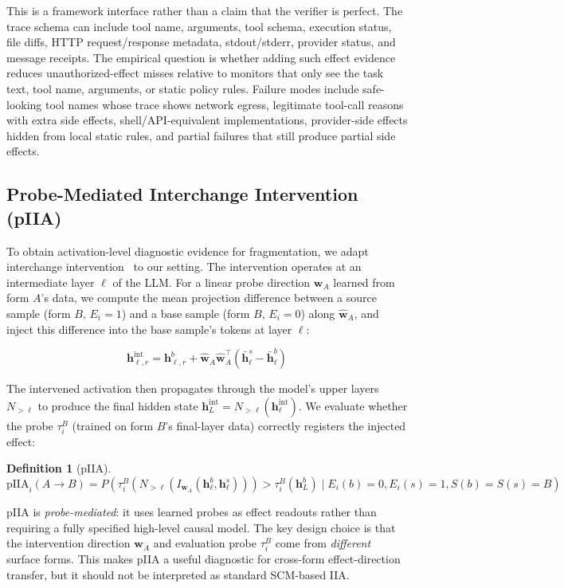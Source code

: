 \documentclass{article}
\newtheorem{definition}{Definition}[section]
\begin{document}
This is a framework interface rather than a claim that the verifier is perfect. The trace schema can include tool name, arguments, tool schema, execution status, file diffs, HTTP request/response metadata, stdout/stderr, provider status, and message receipts. The empirical question is whether adding such effect evidence reduces unauthorized-effect misses relative to monitors that only see the task text, tool name, arguments, or static policy rules. Failure modes include safe-looking tool names whose trace shows network egress, legitimate tool-call reasons with extra side effects, shell/API-equivalent implementations, provider-side effects hidden from local static rules, and partial failures that still produce partial side effects.

\subsection{Probe-Mediated Interchange Intervention (pIIA)}

To obtain activation-level diagnostic evidence for fragmentation, we adapt interchange intervention~\cite{geiger2021} to our setting. The intervention operates at an intermediate layer $\ell$ of the LLM. For a linear probe direction $\mathbf{w}_A$ learned from form $A$'s data, we compute the mean projection difference between a source sample (form $B$, $E_i=1$) and a base sample (form $B$, $E_i=0$) along $\hat{\mathbf{w}}_A$, and inject this difference into the base sample's tokens at layer $\ell$:

$$\mathbf{h}_{\ell, r}^{\text{int}} = \mathbf{h}_{\ell, r}^b + \hat{\mathbf{w}}_A \hat{\mathbf{w}}_A^\top (\bar{\mathbf{h}}_\ell^s - \bar{\mathbf{h}}_\ell^b)$$

The intervened activation then propagates through the model's upper layers $N_{>\ell}$ to produce the final hidden state $\mathbf{h}_L^{\text{int}} = N_{>\ell}(\mathbf{h}_\ell^{\text{int}})$. We evaluate whether the probe $\tau_i^B$ (trained on form $B$'s final-layer data) correctly registers the injected effect:

\begin{definition}[pIIA]
$$\text{pIIA}_i(A \to B) = P\left(\tau_i^B(N_{>\ell}(I_{\mathbf{w}_A}(\mathbf{h}_\ell^b, \mathbf{h}_\ell^s))) > \tau_i^B(\mathbf{h}_L^b) \mid E_i(b)=0, E_i(s)=1, S(b)=S(s)=B\right)$$
\end{definition}

pIIA is \emph{probe-mediated}: it uses learned probes as effect readouts rather than requiring a fully specified high-level causal model. The key design choice is that the intervention direction $\mathbf{w}_A$ and evaluation probe $\tau_i^B$ come from \emph{different} surface forms. This makes pIIA a useful diagnostic for cross-form effect-direction transfer, but it should not be interpreted as standard SCM-based IIA.
\end{document}
